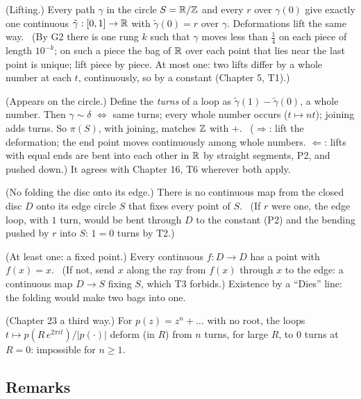 \begin{lines}
\item[\lab{T1}] (Lifting.) Every path $\gamma$ in the circle $S = \mathbb{R}/\mathbb{Z}$ and every $r$ over $\gamma(0)$ give exactly one continuous $\tilde\gamma : [0, 1] \to \mathbb{R}$ with $\tilde\gamma(0) = r$ over $\gamma$. Deformations lift the same way. \ (By G2 there is one rung $k$ such that $\gamma$ moves less than $\tfrac14$ on each piece of length $10^{-k}$; on such a piece the bag of $\mathbb{R}$ over each point that lies near the last point is unique; lift piece by piece. At most one: two lifts differ by a whole number at each $t$, continuously, so by a constant (Chapter 5, T1).)
\item[\lab{T2}] (Appears on the circle.) Define the \emph{turns} of a loop as $\tilde\gamma(1) - \tilde\gamma(0)$, a whole number. Then $\gamma \sim \delta$ $\iff$ same turns; every whole number occurs ($t \mapsto nt$); joining adds turns. So $\pi(S)$, with joining, matches $\mathbb{Z}$ with $+$. \ ($\Rightarrow$: lift the deformation; the end point moves continuously among whole numbers. $\Leftarrow$: lifts with equal ends are bent into each other in $\mathbb{R}$ by straight segments, P2, and pushed down.) It agrees with Chapter 16, T6 wherever both apply.
\item[\lab{T3}] (No folding the disc onto its edge.) There is no continuous map from the closed disc $D$ onto its edge circle $S$ that fixes every point of $S$. \ (If $r$ were one, the edge loop, with $1$ turn, would be bent through $D$ to the constant (P2) and the bending pushed by $r$ into $S$: $1 = 0$ turns by T2.)
\item[\lab{T4}] (At least one: a fixed point.) Every continuous $f : D \to D$ has a point with $f(x) = x$. \ (If not, send $x$ along the ray from $f(x)$ through $x$ to the edge: a continuous map $D \to S$ fixing $S$, which T3 forbids.) Existence by a ``Dies'' line: the folding would make two bags into one.
\item[\lab{T5}] (Chapter 23 a third way.) For $p(z) = z^n + \dots$ with no root, the loops $t \mapsto p(R\,e^{2\pi i t}) / |p(\cdot)|$ deform (in $R$) from $n$ turns, for large $R$, to $0$ turns at $R = 0$: impossible for $n \ge 1$.
\end{lines}

\subsection*{Remarks}

